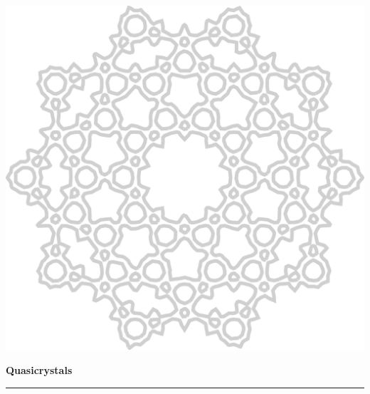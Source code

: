 \documentclass[12pt]{article}
\newcommand{\HRule}{\rule{\linewidth}{0.5mm}}
\begin{document}
\thispagestyle{empty}
\thispagestyle{empty}
\begin{minipage}{0.12\textwidth}
\includegraphics[width=1\textwidth]{./qq552.pdf}
\end{minipage}\hspace{1em}
\begin{minipage}{0.2\textwidth}
\end{minipage}
\begin{minipage}{0.8\textwidth}
{\Huge \bfseries Quasicrystals}\\
\HRule\\
\end{minipage}
\vspace{10 mm}
\end{document}
